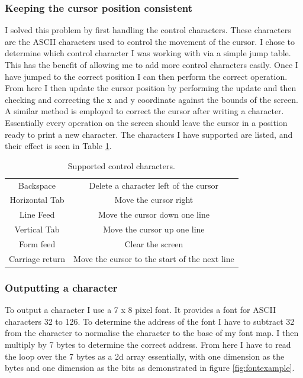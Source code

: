 \subsubsection{Keeping the cursor position consistent}
I solved this problem by first handling the control characters. These characters are the ASCII characters used to control the movement of the cursor. I chose to determine which control character I was working with via a simple jump table. This has the benefit of allowing me to add more control characters easily. Once I have jumped to the correct position I can then perform the correct operation. From here I then update the cursor position by performing the update and then checking and correcting the x and y coordinate against the bounds of the screen. A similar method is employed to correct the cursor after writing a character. Essentially every operation on the screen should leave the cursor in a position ready to print a new character. The characters I have supported are listed, and their effect is seen in Table \ref{controlcharacters}.
\begin{table}[H]
	\centering
	\caption{Supported control characters.\label{controlcharacters}}
	\begin{tabular}{|c|c|}
		\hline
		Backspace & Delete a character left of the cursor \\
		Horizontal Tab & Move the cursor right \\
		Line Feed & Move the cursor down one line \\
		Vertical Tab & Move the cursor up one line \\
		Form feed & Clear the screen \\
		Carriage return & Move the cursor to the start of the next line \\
		\hline
	\end{tabular}
\end{table}
\subsubsection{Outputting a character}
To output a character I use a 7 x 8 pixel font. It provides a font for ASCII characters 32 to 126. To determine the address of the font I have to subtract 32 from the character to normalise the character to the base of my font map. I then multiply by 7 bytes to determine the correct address. From here I have to read the loop over the 7 bytes as a 2d array essentially, with one dimension as the bytes and one dimension as the bits as demonstrated in figure \ref{fig:fontexample}.



